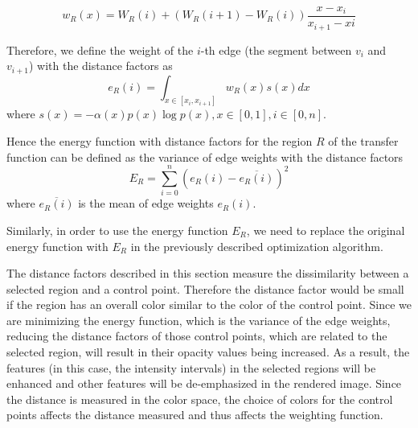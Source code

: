 \[ w_{R}(x)=W_{R}(i) + (W_{R}(i+1)-W_{R}(i))\frac{x-x_{i}}{x_{i+1}-x{i}} \]

Therefore, we define the weight of the $ i $-th edge (the segment between $ v_{i} $ and $ v_{i+1} $) with the distance factors as
\[
e_{R}(i)=\int_{x \in [x_{i}, x_{i+1}]} w_{R}(x)s(x) dx
\]
where $ s(x)=-\alpha(x)p(x) \log p(x), x \in [0,1], i \in [0,n]$.

Hence the energy function with distance factors for the region $ R $ of the transfer function can be defined as the variance of edge weights with the distance factors
\[
E_{R}=\sum_{i=0}^{n}(e_{R}(i)-\overline{e_{R}(i)})^{2}
\]
where $ \overline{e_{R}(i)} $ is the mean of edge weights $e_{R}(i)$.


Similarly, in order to use the energy function $ E_{R} $, we need to replace the original energy function with $ E_{R} $ in the previously described optimization algorithm.


The distance factors described in this section measure the dissimilarity between a selected region and a control point. Therefore the distance factor would be small if the region has an overall color similar to the color of the control point.
Since we are minimizing the energy function, which is the variance of the edge weights, reducing the distance factors of those control points, which are related to the selected region, will result in their opacity values being increased. As a result, the features (in this case, the intensity intervals) in the selected regions will be enhanced and other features will be de-emphasized in the rendered image.
Since the distance is measured in the color space, the choice of colors for the control points affects the distance measured and thus affects the weighting function.


